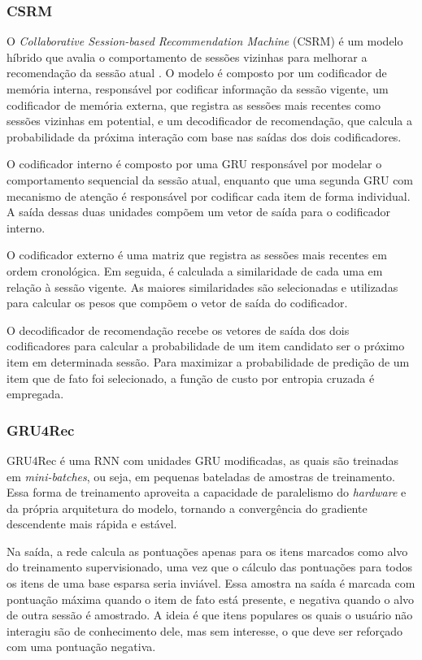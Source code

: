 \subsubsection{CSRM}
O \textit{Collaborative Session-based Recommendation Machine} (CSRM) é um modelo
híbrido que avalia o comportamento de sessões vizinhas para melhorar a
recomendação da sessão atual \cite{collaborative2018}. O modelo é composto por um
codificador de memória interna, responsável por codificar informação da sessão
vigente, um codificador de memória externa, que registra as sessões mais
recentes como sessões vizinhas em potential, e um decodificador de recomendação,
que calcula a probabilidade da próxima interação com base nas saídas dos dois
codificadores.

O codificador interno é composto por uma GRU responsável por modelar
o comportamento sequencial da sessão atual, enquanto que uma segunda GRU com
mecanismo de atenção é responsável por codificar cada item de forma individual.
A saída dessas duas unidades compõem um vetor de saída para o codificador interno.

O codificador externo é uma matriz que registra as sessões mais recentes em
ordem cronológica. Em seguida, é calculada a similaridade de cada uma em relação
à sessão vigente. As maiores similaridades são selecionadas e utilizadas para
calcular os pesos que compõem o vetor de saída do codificador.

O decodificador de recomendação recebe os vetores de saída dos dois
codificadores para calcular a probabilidade de um item candidato ser o próximo
item em determinada sessão. Para maximizar a probabilidade de predição de um
item que de fato foi selecionado, a função de custo por entropia cruzada é
empregada.

\subsubsection{GRU4Rec}
GRU4Rec  \cite{gru4rec_1, gru4rec_2} é uma RNN com unidades GRU modificadas, as
quais são treinadas em \textit{mini-batches}, ou seja, em pequenas bateladas de
amostras de treinamento. Essa forma de treinamento aproveita a capacidade de
paralelismo do \textit{hardware} e da própria arquitetura do modelo, tornando a
convergência do gradiente descendente mais rápida e estável.

Na saída, a rede calcula as pontuações apenas para os itens marcados como
alvo do treinamento supervisionado, uma vez que o cálculo das
pontuações para todos os itens de uma base esparsa seria inviável. Essa amostra
na saída é marcada com pontuação máxima quando o item de fato está presente, e
negativa quando o alvo de outra sessão é amostrado. A ideia é que itens
populares os quais o usuário não interagiu são de conhecimento dele, mas sem
interesse, o que deve ser reforçado com uma pontuação negativa.

